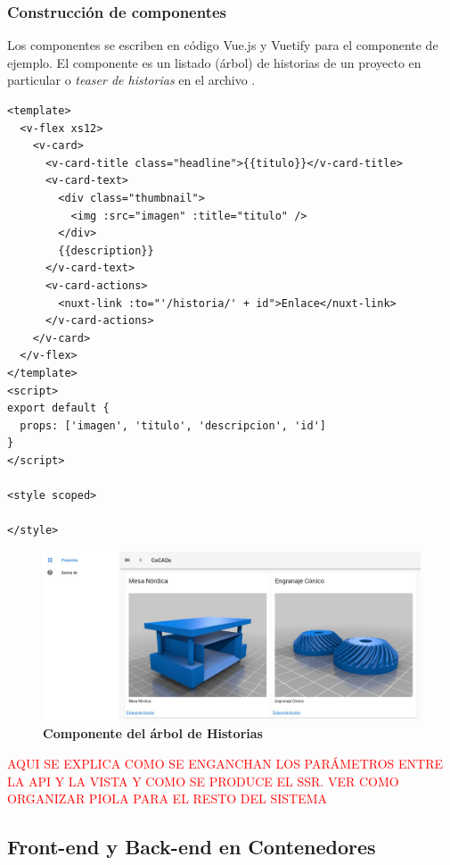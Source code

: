 \subsubsection{Construcción de componentes}
Los componentes se escriben en código Vue.js y Vuetify para el componente de ejemplo.
El componente es un listado (árbol) de historias de un proyecto en particular o \textit{teaser de historias} en el archivo . 

\begin{verbatim}
<template>
  <v-flex xs12>
    <v-card>
      <v-card-title class="headline">{{titulo}}</v-card-title>
      <v-card-text>
        <div class="thumbnail">
          <img :src="imagen" :title="titulo" />
        </div>
        {{description}}
      </v-card-text>
      <v-card-actions>
        <nuxt-link :to="'/historia/' + id">Enlace</nuxt-link>
      </v-card-actions>
    </v-card>
  </v-flex>
</template>
<script>
export default {
  props: ['imagen', 'titulo', 'descripcion', 'id']
}
</script>

<style scoped>

</style>
\end{verbatim}

\begin{figure}[h]
    \includegraphics[width=16cm]{Img/Desarrollo/cocada0.jpg}
    \centering
    \caption{\textbf{ \footnotesize{Componente del árbol de Historias}}}
    \label{fig:cocada0}
\end{figure}

\textcolor{red}{AQUI SE EXPLICA COMO SE ENGANCHAN LOS PARÁMETROS ENTRE LA API Y LA VISTA Y COMO SE PRODUCE EL SSR. VER COMO ORGANIZAR PIOLA PARA EL RESTO DEL SISTEMA}

\subsection{Front-end y Back-end en Contenedores}

